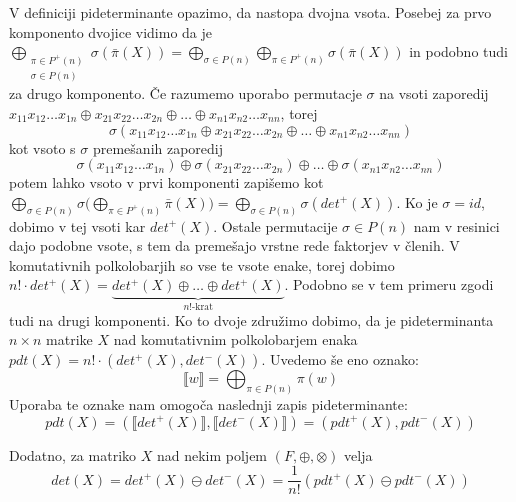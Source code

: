 \documentclass[mat1]{fmfdelo}
\begin{document}
V definiciji pideterminante opazimo, da nastopa dvojna vsota. Posebej za prvo komponento dvojice vidimo da je $\bigoplus_{\substack{\pi\in P^{+}(n) \\ \sigma\in P(n)}}\sigma(\bar{\pi}(X)) = \bigoplus_{\sigma \in P(n)} \bigoplus_{\pi\in P^{+}(n)}\sigma(\bar{\pi}(X))$ in podobno tudi za drugo komponento. Če razumemo uporabo permutacje $\sigma$ na vsoti zaporedij $x_{11}x_{12}\ldots x_{1n} \oplus x_{21}x_{22}\ldots x_{2n} \oplus \ldots \oplus x_{n1}x_{n2}\ldots x_{nn}$, torej $$\sigma(x_{11}x_{12}\ldots x_{1n} \oplus x_{21}x_{22}\ldots x_{2n} \oplus \ldots \oplus x_{n1}x_{n2}\ldots x_{nn})$$ kot vsoto s $\sigma$ premešanih zaporedij $$\sigma(x_{11}x_{12}\ldots x_{1n}) \oplus \sigma(x_{21}x_{22}\ldots x_{2n}) \oplus \ldots \oplus \sigma(x_{n1}x_{n2}\ldots x_{nn})$$ potem lahko vsoto v prvi komponenti zapišemo kot $\bigoplus_{\sigma \in P(n)}\sigma\big(\bigoplus_{\pi\in P^{+}(n)}\bar{\pi}(X)\big) = \bigoplus_{\sigma \in P(n)}\sigma(det^{+}(X))$. Ko je $\sigma = id$, dobimo v tej vsoti kar $det^{+}(X)$. Ostale permutacije $\sigma\in P(n)$ nam v resinici dajo podobne vsote, s tem da premešajo vrstne rede faktorjev v členih. 
V komutativnih polkolobarjih so vse te vsote enake, torej dobimo $n!\cdot det^{+}(X) = \underbrace{det^{+}(X) \oplus \ldots \oplus det^{+}(X)}_{\text{$n!$-krat}}$. Podobno se v tem primeru zgodi tudi na drugi komponenti. Ko to dvoje združimo dobimo, da je pideterminanta $n\times n$ matrike $X$ nad komutativnim polkolobarjem enaka $pdt(X) = n!\cdot (det^{+}(X), det^{-}(X))$. 
Uvedemo še eno oznako: $$\llbracket w \rrbracket = \bigoplus_{\pi\in P(n)}\pi(w)$$ 
Uporaba te oznake nam omogoča naslednji zapis pideterminante: $$pdt(X) = (\llbracket det^{+}(X) \rrbracket, \llbracket det^{-}(X) \rrbracket) = (pdt^{+}(X), pdt^{-}(X))$$

Dodatno, za matriko $X$ nad nekim poljem $(F, \oplus, \otimes)$ velja $$det(X) = det^{+}(X) \ominus det^{-}(X) = \frac{1}{n!}(pdt^{+}(X) \ominus pdt^{-}(X))$$
\end{document}

